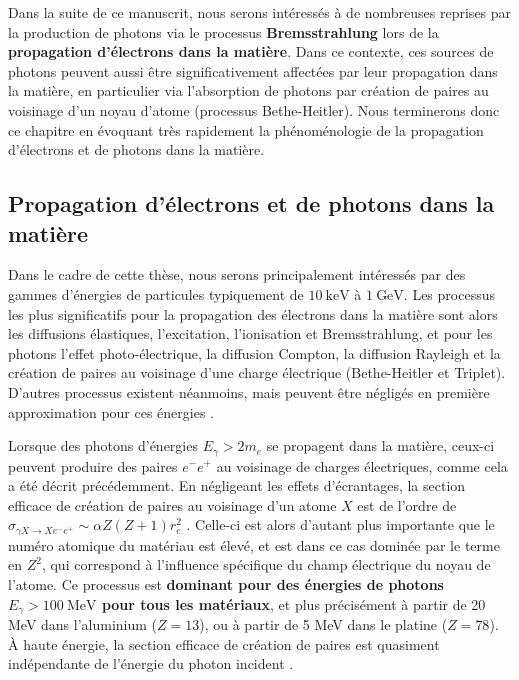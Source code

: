 \begin{refsection}
Dans la suite de ce manuscrit, nous serons intéressés à de nombreuses reprises par la production de photons via le processus \textbf{Bremsstrahlung} lors de la \textbf{propagation d'électrons dans la matière}. Dans ce contexte, ces sources de photons peuvent aussi être significativement affectées par leur propagation dans la matière, en particulier via l'absorption de photons par création de paires au voisinage d'un noyau d'atome (processus Bethe-Heitler). Nous terminerons donc ce chapitre en évoquant très rapidement la phénoménologie de la propagation d'électrons et de photons dans la matière.

\subsection{Propagation d'électrons et de photons dans la matière}

Dans le cadre de cette thèse, nous serons principalement intéressés par des gammes d'énergies de particules typiquement de $10 ~ \si{\keV}$ à $1 ~ \si{\GeV}$. Les processus les plus significatifs pour la propagation des électrons dans la matière sont alors les diffusions élastiques, l'excitation, l'ionisation et Bremsstrahlung, et pour les photons l'effet photo-électrique, la diffusion Compton, la diffusion Rayleigh et la création de paires au voisinage d'une charge électrique (Bethe-Heitler et Triplet). D'autres processus existent néanmoins, mais peuvent être négligés en première approximation pour ces énergies \parencite{carron_2007}.

Lorsque des photons d'énergies $E_\gamma > 2 m_e$ se propagent dans la matière, ceux-ci peuvent produire des paires $e^-e^+$ au voisinage de charges électriques, comme cela a été décrit précédemment. En négligeant les effets d'écrantages, la section efficace de création de paires au voisinage d'un atome $X$ est de l'ordre de $\sigma_{\gamma X \to X e^- e^+} \sim \alpha Z (Z+1) r_e^2$ \parencite{carron_2007}. Celle-ci est alors d'autant plus importante que le numéro atomique du matériau est élevé, et est dans ce cas dominée par le terme en $Z^2$, qui correspond à l'influence spécifique du champ électrique du noyau de l'atome. Ce processus est \textbf{dominant pour des énergies de photons $E_\gamma > 100 ~ \si{\MeV}$ pour tous les matériaux}, et plus précisément à partir de 20 MeV dans l'aluminium ($Z=13$), ou à partir de 5 MeV dans le platine ($Z=78$). À haute énergie, la section efficace de création de paires est quasiment indépendante de l'énergie du photon incident \parencite{carron_2007}. 


\end{refsection}
